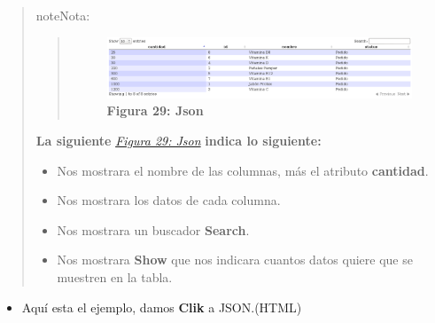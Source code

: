 \documentclass[letterpaper,11pt,spanish]{sphinxmanual}
\begin{document}
\begin{quote}

\begin{notice}{note}{Nota:}\begin{quote}
\begin{figure}[htbp]
\centering
\capstart

\includegraphics{json1.png}
\caption{\textbf{Figura 29: Json}}\label{_templates/Contenido6/Parte3:figura43}\end{figure}
\end{quote}

\textbf{La siguiente} {\hyperref[_templates/Contenido6/Parte3:figura43]{\emph{Figura 29: Json}}} \textbf{indica lo siguiente:}
\begin{itemize}
\item {} 
Nos mostrara el nombre de las columnas, más el atributo \textbf{cantidad}.

\item {} 
Nos mostrara los datos de cada columna.

\item {} 
Nos mostrara un buscador \textbf{Search}.

\item {} 
Nos mostrara \textbf{Show} que nos indicara
cuantos datos quiere que se muestren en la tabla.

\end{itemize}
\end{notice}
\end{quote}
\begin{itemize}
\item {} 
Aquí esta el ejemplo, damos \textbf{Clik} a JSON.(HTML)

\end{itemize}
\end{document}
